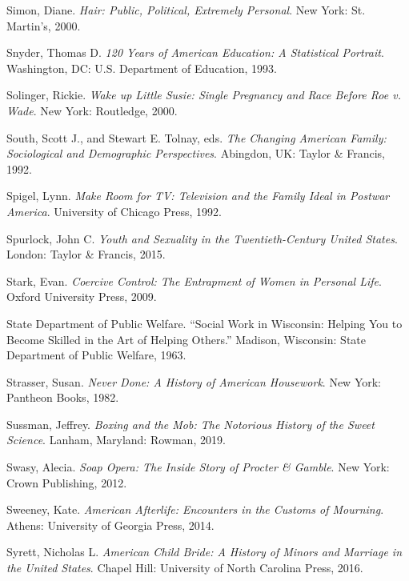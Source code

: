 \documentclass[
  american,
  letterpaper,
]{book}
\newlength{\cslhangindent}
\newenvironment{CSLReferences}[2] %
 {\begin{list}{}{%
  \setlength{\itemindent}{0pt}
  \setlength{\leftmargin}{0pt}
  \setlength{\parsep}{0pt}
  \ifodd #1
   \setlength{\leftmargin}{\cslhangindent}
   \setlength{\itemindent}{-1\cslhangindent}
  \fi
  \setlength{\itemsep}{#2\baselineskip}}}
 {\end{list}}
\begin{document}
\begin{CSLReferences}{1}{0}
Simon, Diane. \emph{Hair: Public, Political, Extremely Personal}. New
York: St. Martin's, 2000.

Snyder, Thomas D. \emph{120 Years of American Education: A Statistical
Portrait}. Washington, DC: U.S. Department of Education, 1993.

Solinger, Rickie. \emph{Wake up Little Susie: Single Pregnancy and Race
Before Roe v. Wade}. New York: Routledge, 2000.

South, Scott J., and Stewart E. Tolnay, eds. \emph{The Changing American
Family: Sociological and Demographic Perspectives}. Abingdon, UK: Taylor
\& Francis, 1992.

Spigel, Lynn. \emph{Make Room for TV: Television and the Family Ideal in
Postwar America}. University of Chicago Press, 1992.

Spurlock, John C. \emph{Youth and Sexuality in the Twentieth-Century
United States}. London: Taylor \& Francis, 2015.

Stark, Evan. \emph{Coercive Control: The Entrapment of Women in Personal
Life}. Oxford University Press, 2009.

State Department of Public Welfare. {``Social Work in Wisconsin: Helping
You to Become Skilled in the Art of Helping Others.''} Madison,
Wisconsin: State Department of Public Welfare, 1963.

Strasser, Susan. \emph{Never Done: A History of American Housework}. New
York: Pantheon Books, 1982.

Sussman, Jeffrey. \emph{Boxing and the Mob: The Notorious History of the
Sweet Science}. Lanham, Maryland: Rowman, 2019.

Swasy, Alecia. \emph{Soap Opera: The Inside Story of Procter \& Gamble}.
New York: Crown Publishing, 2012.

Sweeney, Kate. \emph{American Afterlife: Encounters in the Customs of
Mourning}. Athens: University of Georgia Press, 2014.

Syrett, Nicholas L. \emph{American Child Bride: A History of Minors and
Marriage in the United States}. Chapel Hill: University of North
Carolina Press, 2016.


\end{CSLReferences}
\end{document}
